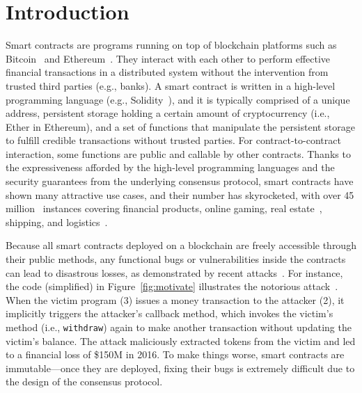 \section{Introduction}\label{sec:intro}
Smart contracts are programs running on top of blockchain platforms such as
Bitcoin~\cite{bitcoin} and Ethereum~\cite{ethereum}.  They interact with each
other to perform effective financial transactions in a distributed system
without the intervention from trusted third parties (e.g., banks). A smart
contract is written in a high-level programming language (e.g.,
Solidity~\cite{solidity}), and it is typically comprised of a unique address,
persistent storage holding a certain amount of cryptocurrency (i.e., Ether in
Ethereum), and a set of functions that manipulate the persistent storage to
fulfill credible transactions without trusted parties. For contract-to-contract
interaction, some functions are public and callable by other contracts. Thanks
to the expressiveness afforded by the high-level programming languages and the
security guarantees from the underlying consensus protocol, smart contracts have
shown many attractive use cases, and their number has skyrocketed, with over 45
million~\cite{etherscan} instances covering financial products, online gaming,
real estate~\cite{case1}, shipping, and logistics~\cite{case2}.

Because all smart contracts deployed on a blockchain are freely accessible
through their public methods, any functional bugs or vulnerabilities inside the
contracts can lead to disastrous losses, as demonstrated by recent
attacks~\cite{attack1,attack2,attack3,attack4}. For instance, the code (simplified) in
Figure~\ref{fig:motivate} illustrates the notorious \reentrancy attack~\cite{attack1}. When the
victim program (3) issues a money transaction
to the attacker (2), it implicitly triggers the attacker's callback method, 
which invokes the victim's method (i.e., \texttt{withdraw}) again to make
another transaction without updating the victim's balance. The attack maliciously extracted tokens
from the victim and led to
a financial loss of \$150M in 2016. To make things worse, smart contracts are
immutable---once they are deployed, fixing their bugs is extremely difficult due
to the design of the consensus protocol.


